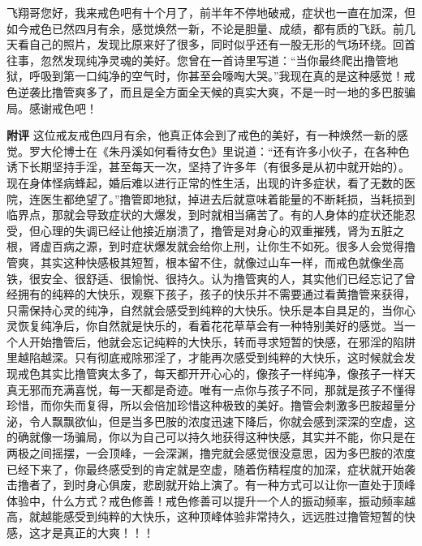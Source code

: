 \begin{case}
    飞翔哥您好，我来戒色吧有十个月了，前半年不停地破戒，症状也一直在加深，但如今戒色已然四月有余，感觉焕然一新，不论是胆量、成绩，都有质的飞跃。前几天看自己的照片，发现比原来好了很多，同时似乎还有一股无形的气场环绕。回首往事，忽然发现纯净灵魂的美好。您曾在一首诗里写道：“当你最终爬出撸管地狱，呼吸到第一口纯净的空气时，你甚至会嚎啕大哭。”我现在真的是这种感觉！戒色逆袭比撸管爽多了，而且是全方面全天候的真实大爽，不是一时一地的多巴胺骗局。感谢戒色吧！

    \textbf{附评} 这位戒友戒色四月有余，他真正体会到了戒色的美好，有一种焕然一新的感觉。罗大伦博士在《朱丹溪如何看待女色》里说道：“还有许多小伙子，在各种色诱下长期坚持手淫，甚至每天一次，坚持了许多年（有很多是从初中就开始的）。现在身体怪病蜂起，婚后难以进行正常的性生活，出现的许多症状，看了无数的医院，连医生都绝望了。”撸管即地狱，掉进去后就意味着能量的不断耗损，当耗损到临界点，那就会导致症状的大爆发，到时就相当痛苦了。有的人身体的症状还能忍受，但心理的失调已经让他接近崩溃了，撸管是对身心的双重摧残，肾为五脏之根，肾虚百病之源，到时症状爆发就会给你上刑，让你生不如死。很多人会觉得撸管爽，其实这种快感极其短暂，根本留不住，就像过山车一样，而戒色就像坐高铁，很安全、很舒适、很愉悦、很持久。认为撸管爽的人，其实他们已经忘记了曾经拥有的纯粹的大快乐，观察下孩子，孩子的快乐并不需要通过看黄撸管来获得，只需保持心灵的纯净，自然就会感受到纯粹的大快乐。快乐是本自具足的，当你心灵恢复纯净后，你自然就是快乐的，看着花花草草会有一种特别美好的感觉。当一个人开始撸管后，他就会忘记纯粹的大快乐，转而寻求短暂的快感，在邪淫的陷阱里越陷越深。只有彻底戒除邪淫了，才能再次感受到纯粹的大快乐，这时候就会发现戒色其实比撸管爽太多了，每天都开开心心的，像孩子一样纯净，像孩子一样天真无邪而充满喜悦，每一天都是奇迹。唯有一点你与孩子不同，那就是孩子不懂得珍惜，而你失而复得，所以会倍加珍惜这种极致的美好。撸管会刺激多巴胺超量分泌，令人飘飘欲仙，但是当多巴胺的浓度迅速下降后，你就会感到深深的空虚，这的确就像一场骗局，你以为自己可以持久地获得这种快感，其实并不能，你只是在两极之间摇摆，一会顶峰，一会深渊，撸完就会感觉很没意思，因为多巴胺的浓度已经下来了，你最终感受到的肯定就是空虚，随着伤精程度的加深，症状就开始袭击撸者了，到时身心俱废，悲剧就开始上演了。有一种方式可以让你一直处于顶峰体验中，什么方式？戒色修善！戒色修善可以提升一个人的振动频率，振动频率越高，就越能感受到纯粹的大快乐，这种顶峰体验非常持久，远远胜过撸管短暂的快感，这才是真正的大爽！！！
\end{case}

